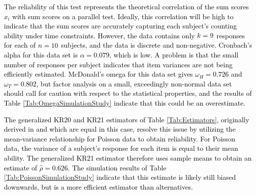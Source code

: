 \documentclass[12pt,epsfig]{article}
\newcommand{\changed}[1]{\textcolor{black}{#1}}
\newcommand{\numsubjects}{\changed{n}}%
\newcommand{\testlength}{\changed{k}}%
\begin{document}
\changed{The reliability of this test represents the theoretical correlation of the sum scores $x_i$ with sum scores on a parallel test. Ideally, this correlation will be high to indicate that the sum scores are accurately capturing each subject's counting ability under time constraints. However, the data contains only $\testlength = 9$ responses for each of $\numsubjects = 10$ subjects, and the data is discrete and non-negative. Cronbach's alpha for this data set is $\alpha = 0.079$, which is  low. A problem is that the small number of responses per subject indicates that item variances are not being efficiently estimated. McDonald's omega for this data set gives $\omega_H = 0.726$ and $\omega_T = 0.802$, but factor analysis on a small, exceedingly non-normal data set should call for caution with respect to the statistical properties, and the results of Table \ref{Tab:OmegaSimulationStudy} indicate that this could be an overestimate.}

\changed{The generalized KR20 and KR21 estimators of Table \ref{Tab:Estimators}, originally derived in \cite{Allison1978} and which are equal in this case, resolve this issue by utilizing the mean-variance relationship for Poisson data to obtain reliability. For Poisson data, the variance of a subject's response for each item is equal to their mean ability. The generalized KR21 estimator therefore uses sample means to obtain an estimate of $\hat{\rho} = 0.626$. The simulation results of Table \ref{Tab:PoissonSimulationStudy} indicate that this estimate is likely still biased downwards, but is a more efficient estimator than alternatives.}
\end{document}
